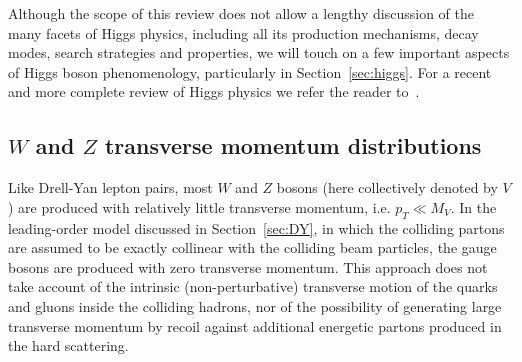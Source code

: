 \documentclass[12pt]{iopart}
\begin{document}
Although the scope of this review does not allow a lengthy discussion of the many facets of Higgs physics, including all its
production mechanisms, decay modes, search strategies and properties, we will touch on a few important aspects of Higgs boson
phenomenology, particularly in Section~\ref{sec:higgs}. For a recent and more complete review of Higgs physics we refer the
reader to~\cite{Djouadi:2005gi}.

\subsection{$W$ and $Z$ transverse momentum distributions}
\label{sec:wzpt}

Like Drell-Yan lepton pairs, most $W$ and $Z$ bosons (here collectively  denoted by $V$) are produced with
relatively little transverse momentum, i.e. $p_T \ll M_V$. In the leading-order model discussed
in Section~\ref{sec:DY}, in which
the colliding partons are assumed to be exactly collinear with the colliding beam particles, the gauge bosons
are produced with zero transverse momentum. This approach does not take account of the intrinsic
(non-perturbative) transverse motion of the quarks and gluons inside the colliding hadrons, nor of the
possibility of generating large transverse momentum by recoil against additional energetic partons produced in
the hard scattering.
\end{document}
